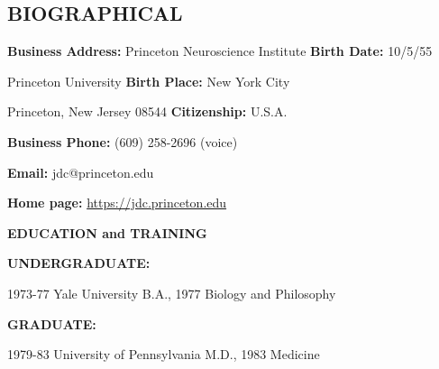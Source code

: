 \documentclass[10 pt]{article}
\begin{document}
    \newpage


    \begin{center}
\section*{BIOGRAPHICAL} \label{secBIOGRAPHICAL}
    \end{center}
    \vspace{0.25in}

\textbf{Business Address:} \hspace{0.2in} Princeton Neuroscience Institute \hspace{0.2in} \textbf{Birth Date:} 10/5/55


\hspace{1.53in} Princeton University \hspace{0.93in} \textbf{Birth Place:} New York City

\hspace{1.53in} Princeton, New Jersey 08544 \hspace{0.43in} \textbf{Citizenship:} U.S.A.
    \smallskip

\textbf{Business Phone:} \hspace{0.31in} (609) 258-2696 (voice)
    \smallskip

\textbf{Email:} \hspace{1in} jdc@princeton.edu

\textbf{Home page:} \hspace{0.62in} \href{https://jdc.princeton.edu}{https://jdc.princeton.edu}
    \vspace{0.8in}

    \begin{center}
{\fontsize{15pt}{16 pt}\selectfont \textbf{EDUCATION and TRAINING}}
    \end{center}
    \vspace{0.25in}

{\fontsize{12pt}{16 pt}\selectfont \textbf{UNDERGRADUATE:}}
    \smallskip

1973-77 Yale University \hspace{1.7in} B.A., 1977 Biology and Philosophy
    \vspace{0.2in}

{\fontsize{12pt}{16 pt}\selectfont \textbf{GRADUATE:}}
    \smallskip

1979-83 University of Pennsylvania  \hspace{1.02in} M.D., 1983 Medicine
\end{document}

